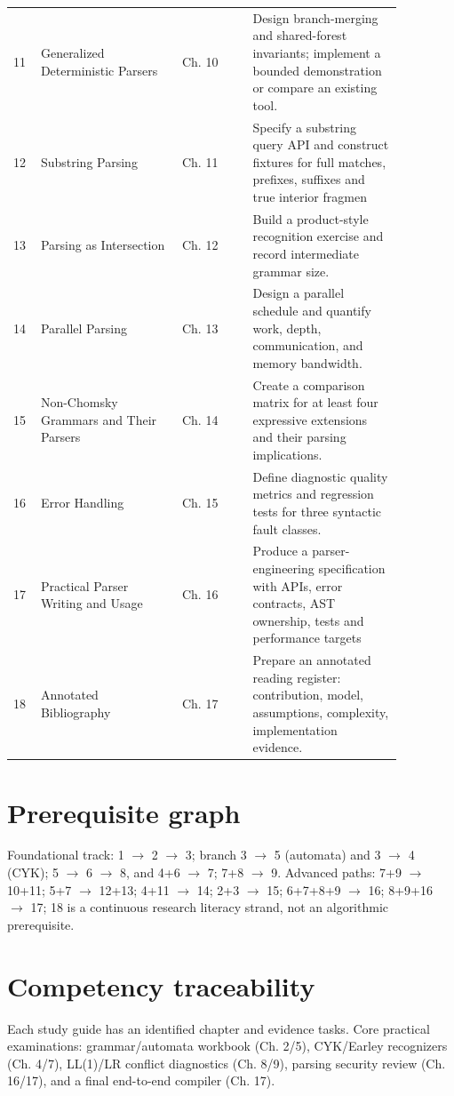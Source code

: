 \documentclass[11pt,letterpaper]{article}
\begin{document}
\begin{longtable}{p{0.05\linewidth}p{0.32\linewidth}p{0.16\linewidth}p{0.34\linewidth}}
11 & Generalized Deterministic Parsers & Ch. 10 & Design branch-merging and shared-forest invariants; implement a bounded demonstration or compare an existing tool.\\
12 & Substring Parsing & Ch. 11 & Specify a substring query API and construct fixtures for full matches, prefixes, suffixes and true interior fragmen\\
13 & Parsing as Intersection & Ch. 12 & Build a product-style recognition exercise and record intermediate grammar size.\\
14 & Parallel Parsing & Ch. 13 & Design a parallel schedule and quantify work, depth, communication, and memory bandwidth.\\
15 & Non-Chomsky Grammars and Their Parsers & Ch. 14 & Create a comparison matrix for at least four expressive extensions and their parsing implications.\\
16 & Error Handling & Ch. 15 & Define diagnostic quality metrics and regression tests for three syntactic fault classes.\\
17 & Practical Parser Writing and Usage & Ch. 16 & Produce a parser-engineering specification with APIs, error contracts, AST ownership, tests and performance targets\\
18 & Annotated Bibliography & Ch. 17 & Prepare an annotated reading register: contribution, model, assumptions, complexity, implementation evidence.\\
\bottomrule\end{longtable}\normalsize
\section{Prerequisite graph}
Foundational track: 1 $\to$ 2 $\to$ 3; branch 3 $\to$ 5 (automata) and 3 $\to$ 4 (CYK); 5 $\to$ 6 $\to$ 8, and 4+6 $\to$ 7; 7+8 $\to$ 9. Advanced paths: 7+9 $\to$ 10+11; 5+7 $\to$ 12+13; 4+11 $\to$ 14; 2+3 $\to$ 15; 6+7+8+9 $\to$ 16; 8+9+16 $\to$ 17; 18 is a continuous research literacy strand, not an algorithmic prerequisite.\par
\section{Competency traceability}
Each study guide has an identified chapter and evidence tasks. Core practical examinations: grammar/automata workbook (Ch. 2/5), CYK/Earley recognizers (Ch. 4/7), LL(1)/LR conflict diagnostics (Ch. 8/9), parsing security review (Ch. 16/17), and a final end-to-end compiler (Ch. 17).\par
{}
\end{document}
